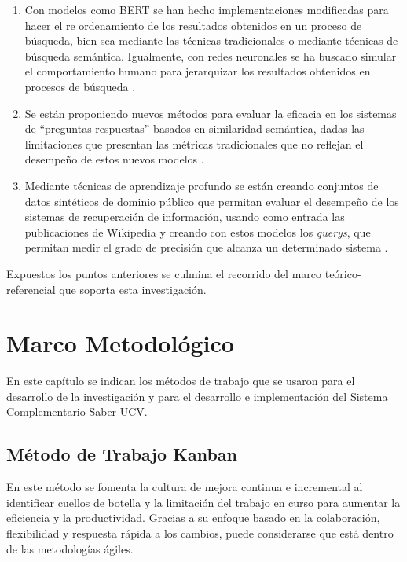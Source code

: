 \documentclass[
  12pt,
  openany]{book}
\begin{document}
\begin{enumerate}
\def\labelenumi{\arabic{enumi}.}
\item
  Con modelos como BERT se han hecho implementaciones modificadas para hacer el re ordenamiento de los resultados obtenidos en un proceso de búsqueda, bien sea mediante las técnicas tradicionales o mediante técnicas de búsqueda semántica\citep{nogueira2019}. Igualmente, con redes neuronales se ha buscado simular el comportamiento humano para jerarquizar los resultados obtenidos en procesos de búsqueda \citep{pang2017}.
\item
  Se están proponiendo nuevos métodos para evaluar la eficacia en los sistemas de ``preguntas-respuestas'' basados en similaridad semántica, dadas las limitaciones que presentan las métricas tradicionales que no reflejan el desempeño de estos nuevos modelos \citep{risch2021}.
\item
  Mediante técnicas de aprendizaje profundo se están creando conjuntos de datos sintéticos de dominio público que permitan evaluar el desempeño de los sistemas de recuperación de información, usando como entrada las publicaciones de Wikipedia y creando con estos modelos los \emph{querys}, que permitan medir el grado de precisión que alcanza un determinado sistema \citep{frej-etal-2020-wikir}.
\end{enumerate}

Expuestos los puntos anteriores se culmina el recorrido del marco teórico-referencial que soporta esta investigación.

\hypertarget{mm}{%
\chapter{Marco Metodológico}\label{mm}}

En este capítulo se indican los métodos de trabajo que se usaron para el desarrollo de la investigación y para el desarrollo e implementación del Sistema Complementario Saber UCV.

\hypertarget{mmmetodologia}{%
\section{Método de Trabajo Kanban}\label{mmmetodologia}}

En este método se fomenta la cultura de mejora continua e incremental al identificar cuellos de botella y la limitación del trabajo en curso para aumentar la eficiencia y la productividad. Gracias a su enfoque basado en la colaboración, flexibilidad y respuesta rápida a los cambios, puede considerarse que está dentro de las metodologías ágiles.
\end{document}
